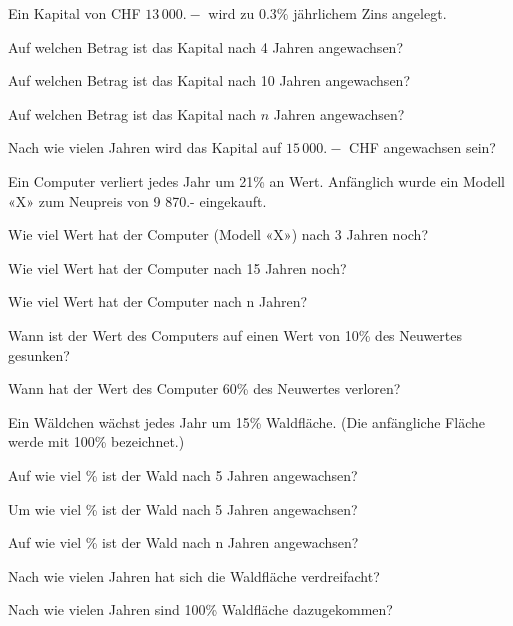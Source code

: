 Ein Kapital von CHF $13\,000.-$ wird zu $0.3\%$ jährlichem Zins angelegt.
\begin{bbwAufgabenBlock}
\item Auf welchen Betrag ist das Kapital nach 4 Jahren
angewachsen?  \plz{}
\item Auf welchen Betrag ist das Kapital nach 10 Jahren
angewachsen?  \plz{}
\item Auf welchen Betrag ist das Kapital nach $n$ Jahren
angewachsen?  \plz{} \noTRAINER{\newpage}
\item Nach wie vielen Jahren wird das Kapital auf $15\,000.-$ CHF
angewachsen sein?  \plz{}
\end{bbwAufgabenBlock}
\platzFuerBerechnungenBisEndeSeite{}
Ein Computer verliert jedes Jahr um 21\% an Wert. Anfänglich wurde ein Modell «X»
zum Neupreis von 9 870.- eingekauft.

\begin{bbwAufgabenBlock}
\item  Wie viel Wert hat der Computer (Modell «X») nach 3 Jahren
noch?  \plz{}
\item Wie viel Wert hat der Computer nach 15 Jahren noch?  \plz{}
\item Wie viel Wert hat der Computer nach n Jahren?  \plz{} \noTRAINER{\newpage}
\item Wann ist der Wert des Computers auf einen Wert von 10\% des
Neuwertes gesunken?  \plz{}
\item Wann hat der Wert des Computer 60\% des Neuwertes
verloren?  \plz{}
\end{bbwAufgabenBlock}

\platzFuerBerechnungenBisEndeSeite{}
Ein Wäldchen wächst jedes Jahr um 15\% Waldfläche. (Die anfängliche Fläche werde mit
100\% bezeichnet.)
\begin{bbwAufgabenBlock}
\item Auf wie viel \% ist der Wald nach 5 Jahren angewachsen?  \plz{}
\item Um wie viel \% ist der Wald nach 5 Jahren angewachsen?  \plz{}
\item Auf wie viel \% ist der Wald nach n Jahren
angewachsen?  \plz{} \noTRAINER{\newpage}
\item Nach wie vielen Jahren hat sich die Waldfläche
verdreifacht?  \plz{}
\item Nach wie vielen Jahren sind 100\% Waldfläche
dazugekommen?  \plz{}
\end{bbwAufgabenBlock}

\platzFuerBerechnungenBisEndeSeite{}

